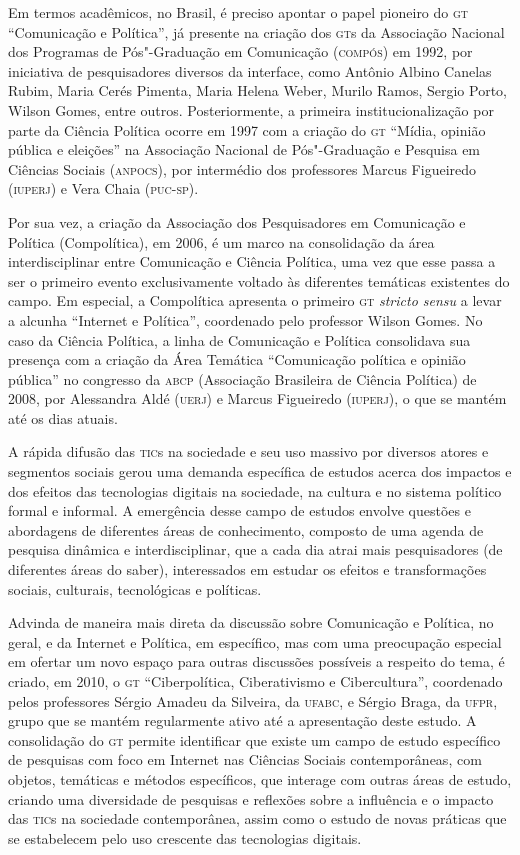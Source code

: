 Em termos acadêmicos, no Brasil, é preciso apontar o papel pioneiro do
\textsc{gt} ``Comunicação e Política'', já presente na criação dos \textsc{gt}s da
Associação Nacional dos Programas de Pós"-Graduação em Comunicação
(\textsc{compós}) em 1992, por iniciativa de pesquisadores diversos da interface,
como Antônio Albino Canelas Rubim, Maria Cerés Pimenta, Maria Helena
Weber, Murilo Ramos, Sergio Porto, Wilson Gomes, entre outros.
Posteriormente, a primeira institucionalização por parte da Ciência
Política ocorre em 1997 com a criação do \textsc{gt} ``Mídia, opinião pública e
eleições'' na Associação Nacional de Pós"-Graduação e Pesquisa em
Ciências Sociais (\textsc{anpocs}), por intermédio dos professores Marcus
Figueiredo (\textsc{iuperj}) e Vera Chaia (\textsc{puc}-\textsc{sp}).

Por sua vez, a criação da Associação dos Pesquisadores em Comunicação e
Política (Compolítica), em 2006, é um marco na consolidação da área
interdisciplinar entre Comunicação e Ciência Política, uma vez que esse
passa a ser o primeiro evento exclusivamente voltado às diferentes
temáticas existentes do campo. Em especial, a Compolítica apresenta o
primeiro \textsc{gt} \emph{stricto sensu} a levar a alcunha ``Internet e
Política'', coordenado pelo professor Wilson Gomes. No caso da Ciência
Política, a linha de Comunicação e Política consolidava sua presença com
a criação da Área Temática ``Comunicação política e opinião pública'' no
congresso da \textsc{abcp} (Associação Brasileira de Ciência Política) de 2008,
por Alessandra Aldé (\textsc{uerj}) e Marcus Figueiredo (\textsc{iuperj}), o que se mantém
até os dias atuais.

A rápida difusão das \textsc{tic}s na sociedade e seu uso massivo por diversos
atores e segmentos sociais gerou uma demanda específica de estudos
acerca dos impactos e dos efeitos das tecnologias digitais na sociedade,
na cultura e no sistema político formal e informal. A emergência desse
campo de estudos envolve questões e abordagens de diferentes áreas de
conhecimento, composto de uma agenda de pesquisa dinâmica e
interdisciplinar, que a cada dia atrai mais pesquisadores (de diferentes
áreas do saber), interessados em estudar os efeitos e transformações
sociais, culturais, tecnológicas e políticas.

Advinda de maneira mais direta da discussão sobre Comunicação e
Política, no geral, e da Internet e Política, em específico, mas com uma
preocupação especial em ofertar um novo espaço para outras discussões
possíveis a respeito do tema, é criado, em 2010, o \textsc{gt} ``Ciberpolítica,
Ciberativismo e Cibercultura'', coordenado pelos professores Sérgio
Amadeu da Silveira, da \textsc{ufabc}, e Sérgio Braga, da \textsc{ufpr}, grupo que se
mantém regularmente ativo até a apresentação deste estudo. A
consolidação do \textsc{gt} permite identificar que existe um campo de estudo
específico de pesquisas com foco em Internet nas Ciências Sociais
contemporâneas, com objetos, temáticas e métodos específicos, que
interage com outras áreas de estudo, criando uma diversidade de
pesquisas e reflexões sobre a influência e o impacto das \textsc{tic}s na
sociedade contemporânea, assim como o estudo de novas práticas que se
estabelecem pelo uso crescente das tecnologias digitais.

